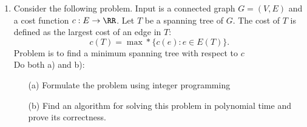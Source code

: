 \documentclass[11pt, oneside]{article}
\begin{document}
\begin{enumerate}
  \item %
    Consider the following problem. 
    Input is a connected graph $G=(V,E)$ and a cost function $c:E \rightarrow \RR$.
    Let $T$ be a spanning tree of $G$. The cost of $T$ is defined as the largest cost of an edge
    in $T$: 
    \[
      c(T) = \max*\{c(e): e \in E(T)\}.
    \]
    Problem is to find a minimum spanning tree with respect to $c$\\
    Do both a) and b):
    \begin{enumerate}
      \item[(a)]
        Formulate the problem using integer programming
      \item[(b)]
        Find an algorithm for solving this problem in polynomial time and prove its correctness.
    \end{enumerate}
\end{enumerate}
\end{document}
